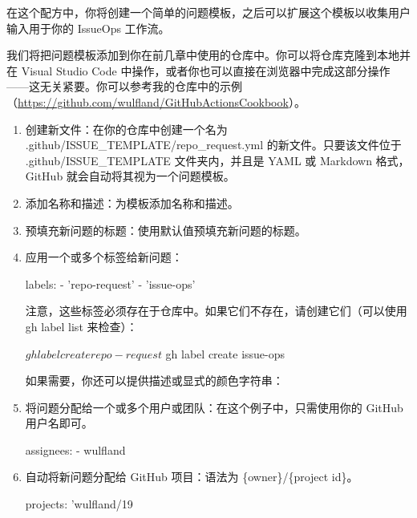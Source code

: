 在这个配方中，你将创建一个简单的问题模板，之后可以扩展这个模板以收集用户输入用于你的 IssueOps 工作流。


我们将把问题模板添加到你在前几章中使用的仓库中。你可以将仓库克隆到本地并在 Visual Studio Code 中操作，或者你也可以直接在浏览器中完成这部分操作——这无关紧要。你可以参考我的仓库中的示例（\url{https://github.com/wulfland/GitHubActionsCookbook}）。


\begin{enumerate}
\item 
创建新文件：在你的仓库中创建一个名为 .github/ISSUE\_TEMPLATE/repo\_request.yml 的新文件。只要该文件位于 .github/ISSUE\_TEMPLATE 文件夹内，并且是 YAML 或 Markdown 格式，GitHub 就会自动将其视为一个问题模板。

\item 
添加名称和描述：为模板添加名称和描述。


\item 
预填充新问题的标题：使用默认值预填充新问题的标题。


\item 
应用一个或多个标签给新问题：

\begin{shell}
labels:
  - 'repo-request'
  - 'issue-ops'
\end{shell}

注意，这些标签必须存在于仓库中。如果它们不存在，请创建它们（可以使用 gh label list 来检查）：

\begin{shell}
$ gh label create repo-request
$ gh label create issue-ops
\end{shell}

如果需要，你还可以提供描述或显式的颜色字符串：


\item 
将问题分配给一个或多个用户或团队：在这个例子中，只需使用你的 GitHub 用户名即可。

\begin{shell}
assignees:
  - wulfland
\end{shell}

\item 
自动将新问题分配给 GitHub 项目：语法为 \{owner\}/\{project id\}。

\begin{shell}
projects: 'wulfland/19
\end{shell}
\end{enumerate}


